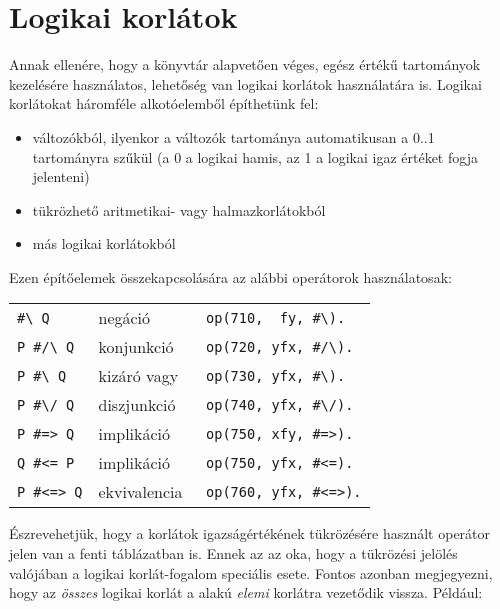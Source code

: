 \section{Logikai korlátok}

Annak ellenére, hogy a \clpfd könyvtár alapvetően véges, egész értékű tartományok
kezelésére használatos, lehetőség van logikai korlátok használatára is. Logikai
korlátokat háromféle alkotóelemből építhetünk fel:

\begin{itemize}
\item változókból, ilyenkor a változók tartománya automatikusan a 0..1 tartományra
szűkül (a 0 a logikai hamis, az 1 a logikai igaz értéket fogja jelenteni)
\item tükrözhető aritmetikai- vagy halmazkorlátokból
\item más logikai korlátokból
\end{itemize}

Ezen építőelemek összekapcsolására az alábbi operátorok használatosak:

\begin{center}\begin{tabular}{|l|l|l|}
\hline
\verb'#\ Q'     &           negáció\ \ \ \ \ & \verb'op(710,  fy, #\).'\\
\verb'P #/\ Q'  &           konjunkció       & \verb'op(720, yfx, #/\).'\\
\verb'P #\ Q'   &           kizáró vagy      & \verb'op(730, yfx, #\).'\\
\verb'P #\/ Q'  &           diszjunkció      & \verb'op(740, yfx, #\/).'\\
\verb'P #=> Q'  &           implikáció       & \verb'op(750, xfy, #=>).'\\
\verb'Q #<= P'  &           implikáció       & \verb'op(750, yfx, #<=).'\\
\verb'P #<=> Q' &           ekvivalencia     & \verb'op(760, yfx, #<=>).'\\
\hline
\end{tabular}\end{center}

Észrevehetjük, hogy a korlátok igazságértékének tükrözésére használt \cd{\#<=>}
operátor jelen van a fenti táblázatban is. Ennek az az oka, hogy a tükrözési
jelölés valójában a logikai korlát-fogalom speciális esete. Fontos azonban megjegyezni,
hogy az \emph{összes} logikai korlát a  alakú \emph{elemi}
korlátra vezetődik vissza. Például:

\begin{center}
\end{center}

